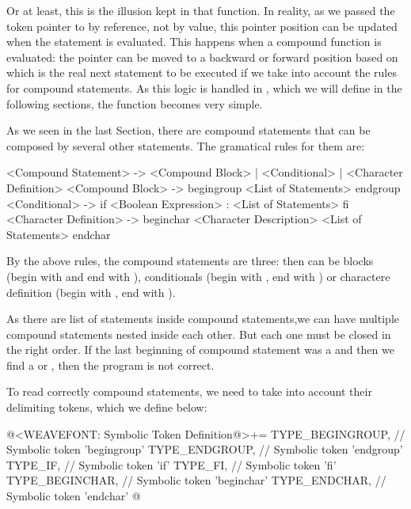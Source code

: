 Or at least, this is the illusion kept in that function. In reality,
as we passed the  token pointer
to  by reference, not by value, this
pointer position can be updated when the statement is evaluated. This
happens when a compound function is evaluated: the pointer can be
moved to a backward or forward position based on which is the real
next statement to be executed if we take into account the rules for
compound statements. As this logic is handled
in , which we will define in the following
sections, the function  becomes
very simple.



As we seen in the last Section, there are compound statements that can
be composed by several other statements. The gramatical rules for them
are:

\alinhaverbatim
<Compound Statement> -> <Compound Block> |
                        <Conditional> |
                        <Character Definition>
<Compound Block> -> begingroup <List of Statements> endgroup
<Conditional> -> if <Boolean Expression> :
                   <List of Statements>
                 fi
<Character Definition> -> beginchar <Character Description>
                            <List of Statements>
                          endchar
\alinhanormal

By the above rules, the compound statements are three: then can be
blocks (begin with  and end
with ), conditionals (begin with ,
end with ) or charactere definition (begin
with , end with ).

As there are list of statements inside compound statements,we can have
multiple compound statements nested inside each other. But each one
must be closed in the right order. If the last beginning of compound
statement was a  and then we find
a  or , then the program is not
correct.

To read correctly compound statements, we need to take into account
their delimiting tokens, which we define below:

\iniciocodigo
@<WEAVEFONT: Symbolic Token Definition@>+=
TYPE_BEGINGROUP,            // Symbolic token 'begingroup'
TYPE_ENDGROUP,              // Symbolic token 'endgroup'
TYPE_IF,                    // Symbolic token 'if'
TYPE_FI,                    // Symbolic token 'fi'
TYPE_BEGINCHAR,             // Symbolic token 'beginchar'
TYPE_ENDCHAR,               // Symbolic token 'endchar'
@
\fimcodigo

